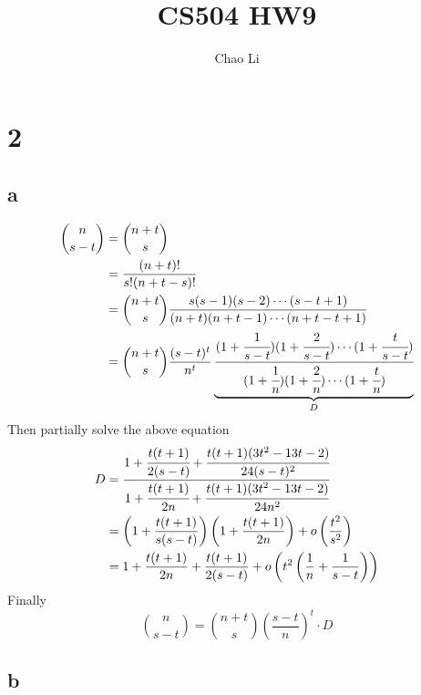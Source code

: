\documentclass[11pt]{article}
\title{CS504 HW9}
\author{Chao Li}
\begin{document}
\maketitle
\section*{2}
\subsection*{a}

\begin{align*}
\binom{n}{s-t}&=\binom{n+t}{s} \\
              &=\frac{(n+t)!}{s!(n+t-s)!} \\
              &=\binom{n+t}{s}\frac{s(s-1)(s-2)\cdots (s-t+1)}{(n+t)(n+t-1)\cdots (n+t-t+1)} \\
              &=\binom{n+t}{s}\frac{(s-t)^t}{n^t}\underbrace{\cfrac{(1+\cfrac{1}{s-t})(1+\cfrac{2}{s-t})\cdots (1+\cfrac{t}{s-t})}{(1+\cfrac{1}{n})(1+\cfrac{2}{n})\cdots (1+\cfrac{t}{n})}}_{D} \\
\end{align*}
Then partially solve the above equation 
\begin{align*}
D&=\cfrac{1+\cfrac{t(t+1)}{2(s-t)}+\cfrac{t(t+1)(3t^2-13t-2)}{24(s-t)^2}}{1+\cfrac{t(t+1)}{2n}+\cfrac{t(t+1)(3t^2-13t-2)}{24n^2}} \\
 &=\left(1+\frac{t(t+1)}{s(s-t)}\right)\left(1+\frac{t(t+1)}{2n}\right)+o\left(\frac{t^2}{s^2}\right) \\
 &=1+\frac{t(t+1)}{2n}+\frac{t(t+1)}{2(s-t)}+o\left(t^2\left(\frac{1}{n}+\frac{1}{s-t}\right)\right)
\end{align*}
Finally
\[
\binom{n}{s-t}=\binom{n+t}{s}\left(\frac{s-t}{n}\right)^t\cdot D
\]
\subsection*{b}
\end{document}
